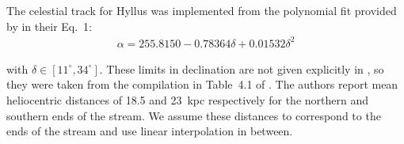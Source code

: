 The celestial track for Hyllus was implemented from the polynomial fit provided by \citet{Grillmair2014} in their Eq.~1:
\begin{eqnarray*}
\alpha = 255.8150 - 0.78364\delta + 0.01532\delta^2
\end{eqnarray*}

with $\delta \in [11^\circ,34^\circ]$. These limits in declination are not given explicitly in \citet{Grillmair2014}, so they were taken from the compilation in Table~4.1 of \citet{GrillmairCarlin2016}. The authors report mean heliocentric distances of 18.5 and 23~kpc respectively for the northern and southern ends of the stream. We assume these distances to correspond to the ends of the stream and use linear interpolation in between.

